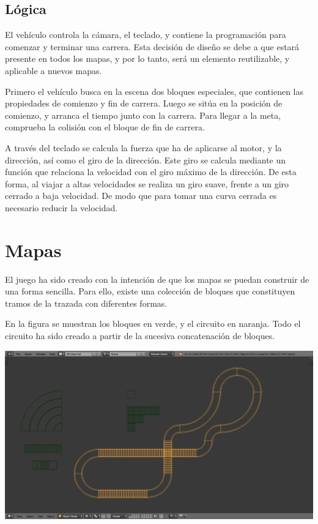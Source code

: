 \documentclass[11pt,a4paper,hidelinks]{article}
\begin{document}
\subsection{Lógica}
El vehículo controla la cámara, el teclado, y contiene la programación para 
comenzar y terminar una carrera. Esta decisión de diseño se debe a que estará 
presente en todos los mapas, y por lo tanto, será un elemento reutilizable, y 
aplicable a nuevos mapas.

Primero el vehículo busca en la escena dos bloques especiales, que contienen las 
propiedades de comienzo y fin de carrera. Luego se sitúa en la posición de 
comienzo, y arranca el tiempo junto con la carrera. Para llegar a la meta, 
comprueba la colisión con el bloque de fin de carrera.

A través del teclado se calcula la fuerza que ha de aplicarse al motor, y la 
dirección, así como el giro de la dirección. Este giro se calcula mediante un 
función que relaciona la velocidad con el giro máximo de la dirección. De esta 
forma, al viajar a altas velocidades se realiza un giro suave, frente a un giro 
cerrado a baja velocidad. De modo que para tomar una curva cerrada es necesario 
reducir la velocidad.

\section{Mapas}
El juego ha sido creado con la intención de que los mapas se puedan construir de 
una forma sencilla. Para ello, existe una colección de bloques que constituyen 
tramos de la trazada con diferentes formas.

En la figura se muestran los bloques en verde, y el circuito en naranja. Todo el 
circuito ha sido creado a partir de la sucesiva concatenación de bloques.

\includegraphics[width=\textwidth]{bloques}
\end{document}
